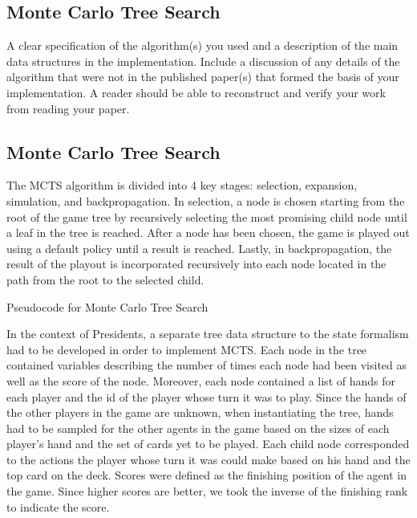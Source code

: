 \documentclass[11pt]{article}
\begin{document}
\subsection{Monte Carlo Tree Search}

A clear specification of the algorithm(s) you used and a description
of the main data structures in the implementation. Include a
discussion of any details of the algorithm that were not in the
published paper(s) that formed the basis of your implementation. A
reader should be able to reconstruct and verify your work from reading
your paper.
\subsection{Monte Carlo Tree Search}

The MCTS algorithm is divided into 4 key stages: selection, expansion, simulation, and backpropagation. In selection, a node is chosen starting from the root of the game tree by recursively selecting the most promising child node until a leaf in the tree is reached. After a node has been chosen, the game is played out using a default policy until a result is reached. Lastly, in backpropagation, the result of the playout is incorporated recursively into each node located in the path from the root to the selected child.\\

\begin{algorithm}
  \begin{algorithmic}
	\EndWhile{}
    \EndProcedure{}
  \end{algorithmic}
  \caption{Pseudocode for Monte Carlo Tree Search}
\end{algorithm}

In the context of Presidents, a separate tree data structure to the state formalism had to be developed in order to implement MCTS. Each node in the tree contained variables describing the number of times each node had been visited as well as the score of the node. Moreover, each node contained a list of hands for each player and the id of the player whose turn it was to play. Since the hands of the other players in the game are unknown, when instantiating the tree, hands had to be sampled for the other agents in the game based on the sizes of each player's hand and the set of cards yet to be played. Each child node corresponded to the actions the player whose turn it was could make based on his hand and the top card on the deck. Scores were defined as the finishing position of the agent in the game. Since higher scores are better, we took the inverse of the finishing rank to indicate the score. \\
\end{document}
